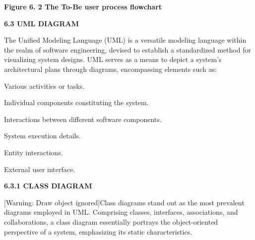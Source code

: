 \documentclass[a4paper]{article}
\begin{document}
{\centering
\hypertarget{3whwml4}{}\textbf{\textcolor[rgb]{0.26666668,0.32941177,0.41568628}{Figure 6. 2 The To-Be user process
flowchart}}
\par}


\bigskip


\bigskip


\bigskip

{\bfseries
\hypertarget{2bn6wsx}{}6.3 UML DIAGRAM}


\bigskip

The Unified Modeling Language (UML) is a versatile modeling language within the realm of software engineering, devised
to establish a standardized method for visualizing system designs. UML serves as a means to depict a system's
architectural plans through diagrams, encompassing elements such as:

Various activities or tasks.

Individual components constituting the system.

Interactions between different software components.

System execution details.

Entity interactions.

External user interface.

{\bfseries
\hypertarget{qsh70q}{}6.3.1 CLASS DIAGRAM}

[Warning: Draw object ignored]Class diagrams stand out as the most prevalent diagrams employed in UML. Comprising
classes, interfaces, associations, and collaborations, a class diagram essentially portrays the object-oriented
perspective of a system, emphasizing its static characteristics.
\end{document}
